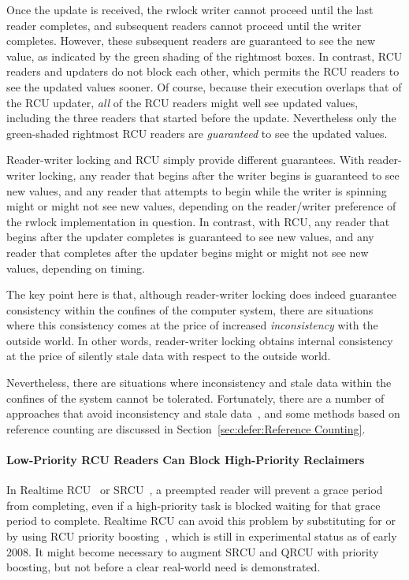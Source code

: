 Once the update is received, the rwlock writer cannot proceed until the
last reader completes, and subsequent readers cannot proceed until the
writer completes.
However, these subsequent readers are guaranteed to see the new value,
as indicated by the green shading of the rightmost boxes.
In contrast, RCU readers and updaters do not block each other, which permits
the RCU readers to see the updated values sooner.
Of course, because their execution overlaps that of the RCU updater,
\emph{all} of the RCU readers might well see updated values, including
the three readers that started before the update.
Nevertheless only the green-shaded rightmost RCU readers
are \emph{guaranteed} to see the updated values.

Reader-writer locking and RCU simply provide different guarantees.
With reader-writer locking, any reader that begins after the writer begins
is guaranteed to see new values, and any reader that attempts to
begin while the writer is spinning might or might not see new values,
depending on the reader/writer preference of the rwlock implementation in
question.
In contrast, with RCU, any reader that begins after the updater completes
is guaranteed to see new values, and any reader that completes after the
updater begins might or might not see new values, depending on timing.

The key point here is that, although reader-writer locking does
indeed guarantee consistency within the confines of the computer system,
there are situations where this consistency comes at the price of
increased \emph{inconsistency} with the outside world.
In other words, reader-writer locking obtains internal consistency at the
price of silently stale data with respect to the outside world.

Nevertheless, there are situations where inconsistency and stale
data within the confines of the system cannot be tolerated.
Fortunately,
there are a number of approaches that avoid inconsistency and stale
data~\cite{PaulEdwardMcKenneyPhD,Arcangeli03}, and some
methods based on reference counting are discussed in
Section~\ref{sec:defer:Reference Counting}.

\paragraph{Low-Priority RCU Readers Can Block High-Priority Reclaimers}

In Realtime RCU~\cite{DinakarGuniguntala2008IBMSysJ} or
SRCU~\cite{PaulEMcKenney2006c},
a preempted reader will prevent a grace period from completing, even if
a high-priority task is blocked waiting for that grace period to complete.
Realtime RCU can avoid this problem by substituting 
for  or by using RCU priority
boosting~\cite{PaulEMcKenney2007BoostRCU,DinakarGuniguntala2008IBMSysJ},
which is still in experimental status as of early 2008.
It might become necessary to augment SRCU and QRCU with priority boosting,
but not before a clear real-world need is demonstrated.

